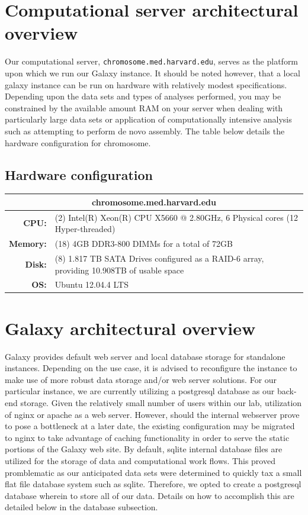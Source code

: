 \documentclass[a4paper,10pt]{article}
\begin{document}
\section{Computational server architectural overview}
Our computational server, \texttt{\footnotesize{chromosome.med.harvard.edu}}, serves as the platform upon which we run our Galaxy instance.  It should be noted however, that a local galaxy instance can be run on hardware with relatively modest specifications.  Depending upon the data sets and types of analyses performed, you may be constrained by the available amount RAM on your server when dealing with particularly large data sets or application of computationally intensive analysis such as attempting to perform de novo assembly.  The table below details the hardware configuration for chromosome.
\subsection{Hardware configuration}
\renewcommand{\arraystretch}{1.5}
\begin{tabular}{|r|p{.8\linewidth}|}
\hline
\multicolumn{2}{|c|}{\textbf{chromosome.med.harvard.edu}}\\
\hline
\textbf{CPU:} & (2) Intel(R) Xeon(R) CPU  X5660  @ 2.80GHz, 6 Physical cores (12 Hyper-threaded)\\
\hline
\textbf{Memory:} & (18) 4GB DDR3-800 DIMMs for a total of 72GB\\
\hline
\textbf{Disk:} & (8) 1.817 TB SATA Drives configured as a RAID-6 array, providing 10.908TB of usable space\\
\hline
\textbf{OS:} & Ubuntu 12.04.4 LTS\\
\hline
\end{tabular}
\section{Galaxy architectural overview}
Galaxy provides default web server and local database storage for standalone instances.  Depending on the use case, it is advised to reconfigure the instance to make use of more robust data storage and/or web server solutions.  For our particular instance, we are currently utilizing a postgresql database as our back-end storage.  Given the relatively small number of users within our lab, utilization of nginx or apache as a web server.  However, should the internal webserver prove to pose a bottleneck at a later date, the existing configuration may be migrated to nginx to take advantage of caching functionality in order to serve the static portions of the Galaxy web site.  By default, sqlite internal database files are utilized for the storage of data and computational work flows.  This proved promblematic as our anticipated data sets were determined to quickly tax a small flat file database system such as sqlite.  Therefore, we opted to create a postgresql database wherein to store all of our data.  Details on how to accomplish this are detailed below in the database subsection.
\end{document}
